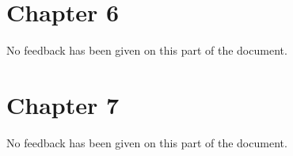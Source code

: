 \section{Chapter 6}
No feedback has been given on this part of the document.

\section{Chapter 7}
No feedback has been given on this part of the document.

